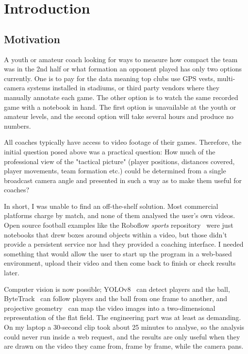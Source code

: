 \chapter{Introduction}
\label{ch:introduction}

\section{Motivation}

A youth or amateur coach looking for ways to measure how compact the team was in the 2nd half or what formation an opponent played has only two options currently. One is to pay for the data meaning top clubs use GPS vests, multi-camera systems installed in stadiums, or third party vendors where they manually annotate each game. The other option is to watch the same recorded game with a notebook in hand. The first option is unavailable at the youth or amateur levels, and the second option will take several hours and produce no numbers.

All coaches typically have access to video footage of their games. Therefore, the initial question posed above was a practical question: How much of the professional view of the "tactical picture" (player positions, distances covered, player movements, team formation etc.) could be determined from a single broadcast camera angle and presented in such a way as to make them useful for coaches?

In short, I was unable to find an off-the-shelf solution. Most commercial platforms charge by match, and none of them analysed the user's own videos.  Open source football examples like the Roboflow \emph{sports} repository~\cite{roboflowsports} were just notebooks that drew boxes around objects within a video, but those didn't provide a persistent service nor had they provided a coaching interface. I needed something that would allow the user to start up the program in a web-based environment, upload their video and then come back to finish or check results later.

Computer vision is now possible; YOLOv8~\cite{yolov8} can detect players and the ball, ByteTrack~\cite{bytetrack} can follow players and the ball from one frame to another, and projective geometry~\cite{hartley} can map the video images into a two-dimensional representation of the flat field. The engineering part was at least as demanding. On my laptop a 30-second clip took about 25 minutes to analyse, so the analysis could never run inside a web request, and the results are only useful when they are drawn on the video they came from, frame by frame, while the camera pans.

